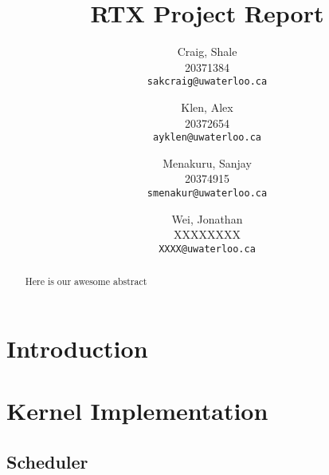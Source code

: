 \documentclass[12pt]{report}
\begin{document}

\title{RTX Project Report}

\author{
    Craig, Shale\\
    20371384\\
    \texttt{sakcraig@uwaterloo.ca}
    \and
    Klen, Alex\\
    20372654\\
    \texttt{ayklen@uwaterloo.ca}
    \and
    Menakuru, Sanjay\\
    20374915\\
    \texttt{smenakur@uwaterloo.ca}
    \and
    Wei, Jonathan\\
    XXXXXXXX\\
    \texttt{XXXX@uwaterloo.ca}
}

\maketitle

\begin{abstract}
    Here is our awesome abstract
\end{abstract}

\tableofcontents
\listofalgorithms



\part{Introduction}

\part{Kernel Implementation}

\chapter{Scheduler}
\end{document}
